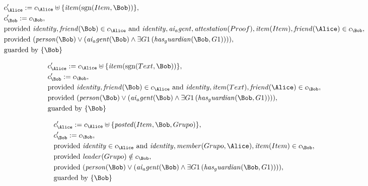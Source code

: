 \begin{align*}
&
c'_
{
\Alice
}
 := 
c_
{
\Alice
}
 \uplus 
\{
\mathit{
item
}
(
\mathrm{sgn}(
Item
,
\Bob
)
)
\}
,\\
&
c'_
{
\Bob
}
 := 
c_
{
\Bob
}
,\\
&
\text{provided } 
\mathit{
identity
}
,
\mathit{
friend
}
(
\Bob
)
 \in c_
{
\Alice
}
 \text{ and } 
\mathit{
identity
}
,
\mathit{
ai_agent
}
,
\mathit{
attestation
}
(
Proof
)
,
\mathit{
item
}
(
Item
)
,
\mathit{
friend
}
(
\Alice
)
 \in c_
{
\Bob
}
,\\
&
\text{provided } 
(
\mathit{
person
}
(
\Bob
)
\lor
(
\mathit{
ai_agent
}
(
\Bob
)
\land
\exists 
G1
\,(
\mathit{
has_guardian
}
(
\Bob
,
G1
)
)
)
)
,\\
&
\text{guarded by } \{
\Bob
\}
\end{align*}

\begin{align*}
&
c'_
{
\Alice
}
 := 
c_
{
\Alice
}
 \uplus 
\{
\mathit{
item
}
(
\mathrm{sgn}(
Text
,
\Bob
)
)
\}
,\\
&
c'_
{
\Bob
}
 := 
c_
{
\Bob
}
,\\
&
\text{provided } 
\mathit{
identity
}
,
\mathit{
friend
}
(
\Bob
)
 \in c_
{
\Alice
}
 \text{ and } 
\mathit{
identity
}
,
\mathit{
item
}
(
Text
)
,
\mathit{
friend
}
(
\Alice
)
 \in c_
{
\Bob
}
,\\
&
\text{provided } 
(
\mathit{
person
}
(
\Bob
)
\lor
(
\mathit{
ai_agent
}
(
\Bob
)
\land
\exists 
G1
\,(
\mathit{
has_guardian
}
(
\Bob
,
G1
)
)
)
)
,\\
&
\text{guarded by } \{
\Bob
\}
\end{align*}

\begin{align*}
&
c'_
{
\Alice
}
 := 
c_
{
\Alice
}
 \uplus 
\{
\mathit{
posted
}
(
Item
,
\Bob
,
Grupo
)
\}
,\\
&
c'_
{
\Bob
}
 := 
c_
{
\Bob
}
,\\
&
\text{provided } 
\mathit{
identity
}
 \in c_
{
\Alice
}
 \text{ and } 
\mathit{
identity
}
,
\mathit{
member
}
(
Grupo
,
\Alice
)
,
\mathit{
item
}
(
Item
)
 \in c_
{
\Bob
}
,\\
&
\text{provided } 
\mathit{
leader
}
(
Grupo
)
 \notin c_
{
\Bob
}
,\\
&
\text{provided } 
(
\mathit{
person
}
(
\Bob
)
\lor
(
\mathit{
ai_agent
}
(
\Bob
)
\land
\exists 
G1
\,(
\mathit{
has_guardian
}
(
\Bob
,
G1
)
)
)
)
,\\
&
\text{guarded by } \{
\Bob
\}
\end{align*}
